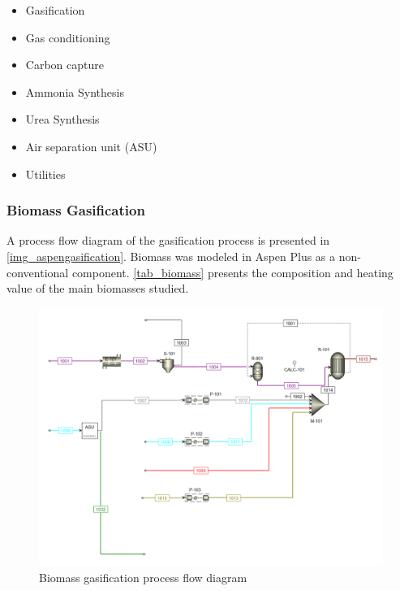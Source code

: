 \documentclass[a4paper, titlepage]{article}
\begin{document}
\begin{itemize}
	\item Gasification
	\item Gas conditioning
	\item Carbon capture
	\item Ammonia Synthesis
	\item Urea Synthesis
	\item Air separation unit (ASU)
	\item Utilities 
\end{itemize}

\subsubsection{Biomass Gasification}

A process flow diagram of the gasification process is presented in \autoref{img_aspengasification}. Biomass was modeled
in Aspen Plus as a non-conventional component. \autoref{tab_biomass} presents the composition and heating value
of the main biomasses studied. 

\begin{figure}
	\includegraphics[width=\textwidth]{img/aspen_gasification.png}
	\caption{Biomass gasification process flow diagram}
	\label{img_aspengasification}
\end{figure}
\end{document}
